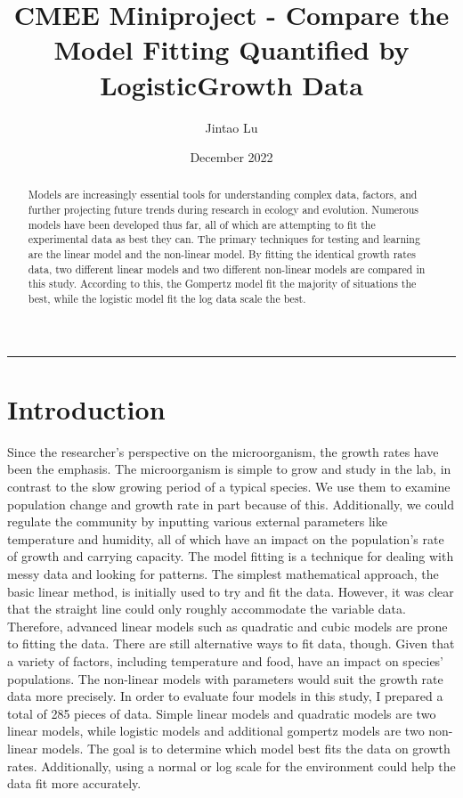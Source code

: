 \documentclass[11pt]{article}
\title{CMEE Miniproject - Compare the Model Fitting Quantified by LogisticGrowth Data}
\author{Jintao Lu}
\date{December 2022}
\begin{document}
\maketitle
\rule{\textwidth}{4pt}

\begin{abstract}
Models are increasingly essential tools for understanding complex data, factors, and further projecting future trends during research in ecology and evolution. Numerous models have been developed thus far, all of which are attempting to fit the experimental data as best they can. The primary techniques for testing and learning are the linear model and the non-linear model\citep{levins1966strategy}. By fitting the identical growth rates data, two different linear models and two different non-linear models are compared in this study. According to this, the Gompertz model fit the majority of situations the best, while the logistic model fit the log data scale the best.

\end{abstract}

\section{Introduction}
Since the researcher's perspective on the microorganism, the growth rates have been the emphasis. The microorganism is simple to grow and study in the lab, in contrast to the slow growing period of a typical species. We use them to examine population change and growth rate in part because of this. Additionally, we could regulate the community by inputting various external parameters like temperature and humidity, all of which have an impact on the population's rate of growth and carrying capacity\citep{johnson2004model}. The model fitting is a technique for dealing with messy data and looking for patterns. The simplest mathematical approach, the basic linear method, is initially used to try and fit the data. However, it was clear that the straight line could only roughly accommodate the variable data. Therefore, advanced linear models such as quadratic and cubic models are prone to fitting the data. There are still alternative ways to fit data, though. Given that a variety of factors, including temperature and food, have an impact on species' populations. The non-linear models with parameters would suit the growth rate data more precisely\citep{bolker2013strategies}.
In order to evaluate four models in this study, I prepared a total of 285 pieces of data. Simple linear models and quadratic models are two linear models, while logistic models and additional gompertz models are two non-linear models. The goal is to determine which model best fits the data on growth rates. Additionally, using a normal or log scale for the environment could help the data fit more accurately.
\end{document}

